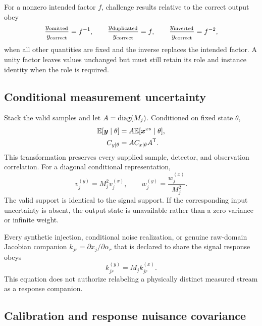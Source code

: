For a nonzero intended factor \(f\), challenge results relative to the correct
output obey
\begin{equation}
 \frac{y_{\rm omitted}}{y_{\rm correct}}=f^{-1},\qquad
 \frac{y_{\rm duplicated}}{y_{\rm correct}}=f,\qquad
 \frac{y_{\rm inverted}}{y_{\rm correct}}=f^{-2},
 \label{eq:factor-challenges}
\end{equation}
when all other quantities are fixed and the inverse replaces the intended
factor. A unity factor leaves values unchanged but must still retain its role
and instance identity when the role is required.

\subsection{Conditional measurement uncertainty}
\label{sec:conditional-uncertainty}

Stack the valid samples and let \(A=\operatorname{diag}(M_j)\). Conditioned on fixed state
\(\theta\),
\begin{align}
 \mathbb{E}[\boldsymbol y\mid\theta]
   &=A\mathbb{E}[\boldsymbol x^{xs}\mid\theta],
 \label{eq:conditional-mean}\\
 C_{y\mid\theta}&=A C_{x\mid\theta}A^{\mathsf T}.
 \label{eq:conditional-covariance}
\end{align}
This transformation preserves every supplied sample, detector, and
observation correlation. For a diagonal conditional representation,
\begin{equation}
 v^{(y)}_j=M_j^2v^{(x)}_j,\qquad
 w^{(y)}_j=\frac{w^{(x)}_j}{M_j^2}.
 \label{eq:variance-weight}
\end{equation}
The valid support is identical to the signal support. If the corresponding
input uncertainty is absent, the output state is unavailable rather than a
zero variance or infinite weight.

Every synthetic injection, conditional noise realization, or genuine
raw-domain Jacobian companion \(k_{jr}=\partial x_j/\partial\alpha_r\) that is
declared to share the signal response obeys
\begin{equation}
 k^{(y)}_{jr}=M_j k^{(x)}_{jr}.
 \label{eq:companion-transfer}
\end{equation}
This equation does not authorize relabeling a physically distinct measured
stream as a response companion.

\subsection{Calibration and response nuisance covariance}
\label{sec:nuisance-equations}

